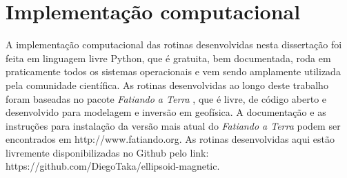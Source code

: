 \chapter{Implementação computacional}

A implementação computacional das rotinas desenvolvidas nesta dissertação foi feita em linguagem livre Python, que é gratuita, bem documentada, roda em praticamente todos os sistemas operacionais e vem sendo amplamente utilizada pela comunidade científica.  
As rotinas desenvolvidas ao longo deste trabalho foram baseadas no pacote \textit{Fatiando a Terra} \citet{uieda-proc-scipy-2013}, que é livre, de código aberto e desenvolvido para modelagem e inversão em geofísica. A documentação e as instruções para instalação da versão mais atual do \textit{Fatiando a Terra} podem ser encontrados em http://www.fatiando.org.
As rotinas desenvolvidas aqui estão livremente disponibilizadas no Github pelo link: https://github.com/DiegoTaka/ellipsoid-magnetic.

